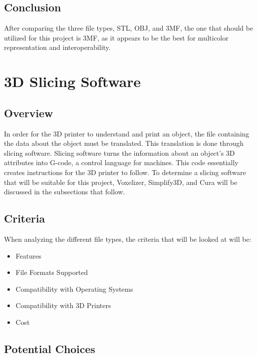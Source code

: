 \documentclass[letterpaper, onecolumn, draftclsnofoot, 10pt, compsoc]{IEEEtran}
\begin{document}
\begin{singlespace}
\subsection{Conclusion}
After comparing the three file types, STL, OBJ, and 3MF, the one that should be utilized for this project is 3MF, as it appears to be the best for multicolor representation and interoperability. 

\section{3D Slicing Software}
\subsection{Overview}
In order for the 3D printer to understand and print an object, the file containing the data about the object must be translated.
This translation is done through slicing software.
Slicing software turns the information about an object's 3D attributes into G-code, a control language for machines. 
This code essentially creates instructions for the 3D printer to follow. \cite{whatisweb}
To determine a slicing software that will be suitable for this project, Voxelizer, Simplify3D, and Cura will be discussed in the subsections that follow. 

\subsection{Criteria}
When analyzing the different file types, the criteria that will be looked at will be: \begin{itemize}
\item Features
\item File Formats Supported
\item Compatibility with Operating Systems
\item Compatibility with 3D Printers
\item Cost

\end{itemize}
\subsection{Potential Choices}

\end{singlespace}
\end{document}
